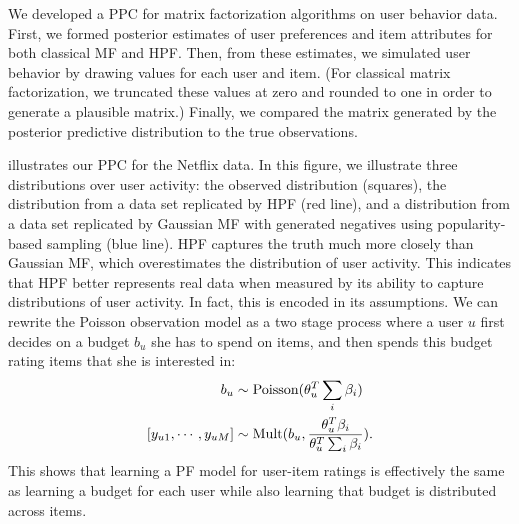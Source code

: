 We developed a PPC for matrix factorization algorithms on user
behavior data.  First, we formed posterior estimates of user
preferences and item attributes for both classical MF and HPF.  Then,
from these estimates, we simulated user behavior by
drawing values for each user and item.  (For classical matrix
factorization, we truncated these values at zero and rounded to one in
order to generate a plausible matrix.)  Finally, we compared
the matrix generated by the posterior predictive distribution to the
true observations.

 illustrates our PPC for the Netflix data.  In this
figure, we illustrate three distributions over user activity: the
observed distribution (squares), the distribution from a data set
replicated by HPF (red line), and a distribution from a data set
replicated by Gaussian MF with generated negatives using
popularity-based sampling (blue line).  HPF captures the truth much
more closely than Gaussian MF, which overestimates the distribution of
user activity. This indicates that HPF better represents real data
when measured by its ability to capture distributions of user
activity.  In fact, this is encoded in its assumptions. We can rewrite
the Poisson observation model as a two stage process where a user $u$
first decides on a budget $b_u$ she has to spend on items, and then
spends this budget rating items that she is interested in:
\begin{align}
b_u & \sim \textrm{Poisson}(\theta_u^T \sum_i \beta_i)\nonumber\\
[y_{u1},\cdots,y_{uM}] & \sim \textrm{Mult}(b_u, \frac{\theta_u^T \beta_i}{\theta_u^T \sum_i \beta_i}).\nonumber
\end{align}
This shows that learning a PF model for user-item ratings is
effectively the same as learning a budget for each user while also
learning that budget is distributed across items.


